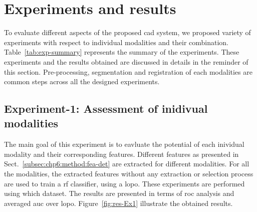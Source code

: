 \section{Experiments and results}\label{sec:chp6:exp-res}
To evaluate different aspects of the proposed \ac{cad} system, we proposed variety of experiments with respect to individual modalities and their combination. 
Table~\ref{tab:exp-summary} represents the summary of the experiments. 
These experiments and the results obtained are discussed in details in the reminder of this section. 
Pre-processing, segmentation and registration of each modalities are common steps across all the designed experiments.

\subsection{Experiment-1: Assessment of inidivual modalities}\label{subec:chp6:exp-res:Ex1} 
The main goal of this experiment is to eavluate the potential of each inividual modality and their corresponding features. 
Different features as presented in Sect.~\ref{subsec:chp6:method:fea-det} are extracted for different modalities. 
For all the modalities, the extracted features without any extraction or selection process are used to train a \ac{rf} classifier, using a \ac{lopo}. 
These experiments are performed using {\color{red} which dataset}.
The results are presented in terms of \ac{roc} analysis and averaged \ac{auc} over \ac{lopo}.
Figure~\ref{fig:res-Ex1} illustrate the obtained results.

